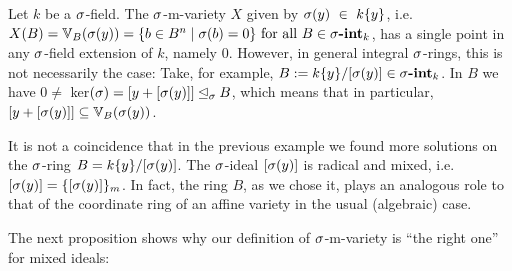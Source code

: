 \begin{ex}
Let $k$ be a $\sigma$-field. The $\sigma$-m-variety $X$ given by $\sigma(y)~\in~k\{y\}$, i.e. $X(B) = \mathbb{V}_B(\sigma(y)) = \{ b \in B^n \mid \sigma(b) = 0 \} \text{ for all } B \in \sigma\text{{\normalfont\textbf{-int}}}_k$, has a single point in any $\sigma$-field extension of $k$, namely $0$. However, in general integral $\sigma$-rings,
this is not necessarily the case: Take, for example, $B:= k\{y\}/[\sigma(y)] \in \sigma\text{{\normalfont\textbf{-int}}}_k$. In $B$ we have $0 \neq $ ker$(\sigma) = [y+ [\sigma(y)]] \unlhd_{\sigma} B$, which means that in particular, $[y + [\sigma(y)]] \subseteq \mathbb{V}_B(\sigma(y))$.
\end{ex}

It is not a coincidence that in the previous example we found more solutions on the $\sigma$-ring $B = k\{y\}/[\sigma(y)]$. The $\sigma$-ideal $[\sigma(y)]$ is radical and mixed, i.e. $[\sigma(y)] = \{ [\sigma(y)] \}_m$.
In fact, the ring $B$, as we chose it, plays an analogous role to that of the coordinate ring of an affine variety in the usual (algebraic) case.

The next proposition shows why our definition of $\sigma$-m-variety is ``the right one'' for mixed ideals:

